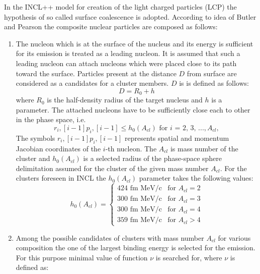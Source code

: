 In the INCL++ model for creation of the light charged particles (LCP) the hypothesis 
of so called surface coalescence \cite{INCLboudard2013new} is adopted.
According to idea of Butler and Pearson \cite{Butler1963} 
the composite nuclear particles are composed as follows: 

\begin{enumerate}[label=(\roman*)]
	
	\item The nucleon which is at the surface of the nucleus and its energy is sufficient for its emission 
	is treated as a leading nucleon. It is assumed that such a leading nucleon 
	can attach nucleons which were placed close to its path toward the surface. 
	Particles present at the distance $D$ from surface are considered as a candidates for a cluster members.
	$D$ is is defined as follows:
	\begin{equation}
		D=R_{0}+h
	\end{equation} 
	where $R_{0}$ is the half-density radius of the target nucleus and $h$ is a parameter. 
	The attached nucleons have to be sufficiently close each to other in the phase space, i.e. 
	\begin{equation}
		r_i,[i-1]p_i,[i-1]\leq h_0\left(A_{cl}\right) \text{  for $i$ = 2, 3, } ..., A_{cl},
	\end{equation} 	
	The symbols $r_i,[i-1]p_i,[i-1]$  represents spatial and momentum Jacobian coordinates of the $i$-th nucleon.  
	The $A_{cl}$ is mass number of the cluster and $h_0\left(A_{cl}\right)$ is a selected radius of the phase-space 
	sphere delimitation assumed for the cluster of the given mass number $A_{cl}$.
	For the clusters foreseen in INCL the $h_{0}(A_{cl})$ parameter takes the following values:
	\begin{equation}
		h_{0}(A_{cl})= \begin{cases} 424 \text{ fm MeV/c} &  \text{for }A_{cl}=2\\ 
			300 \text{ fm MeV/c} &  \text{for }A_{cl}=3\\ 
			300 \text{ fm MeV/c} &  \text{for }A_{cl}=4\\ 
			359 \text{ fm MeV/c} &  \text{for }A_{cl}>4 \end{cases} 
	\end{equation}
	\item Among the possible candidates of clusters with mass number $A_{cl}$ for various composition 
	the one of the largest binding energy is selected for the emission. 
	For this purpose minimal value of function $\nu$ is searched for, where $\nu$ is defined as:

\end{enumerate}
